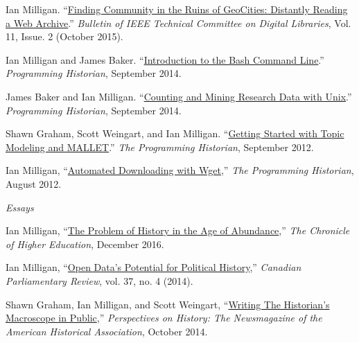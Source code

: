\documentclass[11pt,article,oneside]{memoir}
\begin{document}
\ind Ian Milligan. ``\href{http://www.ieee-tcdl.org/Bulletin/v11n2/papers/milligan.pdf}{Finding Community in the Ruins of GeoCities: Distantly Reading a Web Archive}.'' \emph{Bulletin of IEEE Technical Committee on Digital Libraries}, Vol. 11, Issue. 2  (October 2015).

\ind Ian Milligan and James Baker. ``\href{http://programminghistorian.org/lessons/intro-to-bash}{Introduction to the Bash Command Line}.'' \emph{Programming Historian}, September 2014.

\ind James Baker and Ian Milligan. ``\href{http://programminghistorian.org/lessons/research-data-with-unix}{Counting and Mining Research Data with Unix}.'' \emph{Programming Historian}, September 2014.

\ind Shawn Graham, Scott Weingart, and Ian Milligan. ``\href{http://programminghistorian.org/lessons/topic-modeling-and-mallet}{Getting Started with Topic Modeling and MALLET}.'' \emph{The Programming Historian}, September 2012. 

\ind Ian Milligan, ``\href{http://programminghistorian.org/lessons/automated-downloading-with-wget}{Automated Downloading with Wget},'' \emph{The Programming Historian}, August 2012. 


\bigskip 

\noindent\emph{Essays \vspace{0.05in}}

\ind Ian Milligan, ``\href{http://www.chronicle.com/article/The-Problem-of-History-in-the/238600?key=tZ1LWdA_bVNIm62Zk-gE3HKlSrriqn6ZRqJ3qEr6mmtHr9z8eisDICSwzJhXAzpuMlp1d01xalVFZE41SVk0cmFfeTh2U0lRYTBOazNSQlYxQklNR1BzYzdRbw}{The Problem of History in the Age of Abundance},'' \emph{The Chronicle of Higher Education}, December 2016.

\ind Ian Milligan, ``\href{http://www.revparl.ca/37/4/37n4e_14_Milligan.pdf}{Open Data's Potential for Political History},'' \emph{Canadian Parliamentary Review}, vol. 37, no. 4 (2014).

\ind Shawn Graham, Ian Milligan, and Scott Weingart, ``\href{http://www.historians.org/publications-and-directories/perspectives-on-history/october-2014/writing-the-historian%E2%80%99s-macroscope-in-public}{Writing The Historian's Macroscope in Public},'' \emph{Perspectives on History: The Newsmagazine of the American Historical Association}, October 2014.
\end{document}
